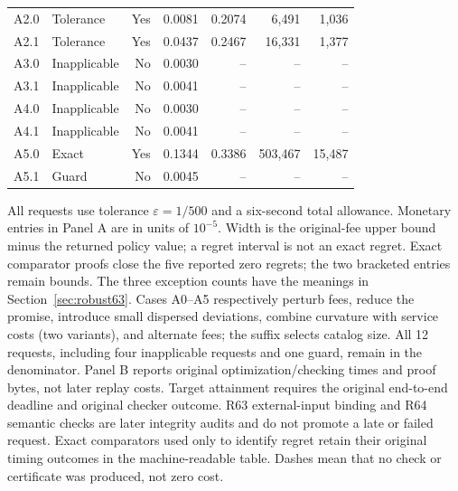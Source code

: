 \documentclass[11pt,letterpaper]{article}
\theoremstyle{definition}\newtheorem{remark}[theorem]{Remark}
\begin{document}
\begin{table}[p]
\begin{singlespace}
\begin{tabular}{llrrrrr}
A2.0 & Tolerance & Yes & 0.0081 & 0.2074 & 6,491 & 1,036 \\
A2.1 & Tolerance & Yes & 0.0437 & 0.2467 & 16,331 & 1,377 \\
A3.0 & Inapplicable & No & 0.0030 & -- & -- & -- \\
A3.1 & Inapplicable & No & 0.0041 & -- & -- & -- \\
A4.0 & Inapplicable & No & 0.0030 & -- & -- & -- \\
A4.1 & Inapplicable & No & 0.0041 & -- & -- & -- \\
A5.0 & Exact & Yes & 0.1344 & 0.3386 & 503,467 & 15,487 \\
A5.1 & Guard & No & 0.0045 & -- & -- & -- \\
\bottomrule\end{tabular}\par\smallskip
\begin{minipage}{\textwidth}\footnotesize
All requests use tolerance $\varepsilon=1/500$ and a six-second total allowance. Monetary entries in Panel A are in units of $10^{-5}$. Width is the original-fee upper bound minus the returned policy value; a regret interval is not an exact regret. Exact comparator proofs close the five reported zero regrets; the two bracketed entries remain bounds. The three exception counts have the meanings in Section~\ref{sec:robust63}. Cases A0--A5 respectively perturb fees, reduce the promise, introduce small dispersed deviations, combine curvature with service costs (two variants), and alternate fees; the suffix selects catalog size. All 12 requests, including four inapplicable requests and one guard, remain in the denominator.
Panel B reports original optimization/checking times and proof bytes, not later replay costs. Target attainment requires the original end-to-end deadline and original checker outcome. R63 external-input binding and R64 semantic checks are later integrity audits and do not promote a late or failed request. Exact comparators used only to identify regret retain their original timing outcomes in the machine-readable table. Dashes mean that no check or certificate was produced, not zero cost.
\end{minipage}\end{singlespace}\end{table}
\end{document}
